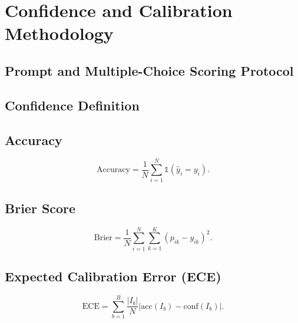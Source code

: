 \documentclass[runningheads]{llncs}
\begin{document}

\section{Confidence and Calibration Methodology}
\subsection{Prompt and Multiple-Choice Scoring Protocol}

\subsection{Confidence Definition}

\subsection{Accuracy}
\begin{equation}
  \mathrm{Accuracy} = \frac{1}{N}\sum_{i=1}^{N}
  \mathbb{1}(\hat{y}_i=y_i).
  \label{eq:accuracy}
\end{equation}

\subsection{Brier Score}
\begin{equation}
  \mathrm{Brier} =
  \frac{1}{N}\sum_{i=1}^{N}\sum_{k=1}^{K}
  (p_{ik}-y_{ik})^2.
  \label{eq:brier}
\end{equation}

\subsection{Expected Calibration Error (ECE)}
\begin{equation}
  \mathrm{ECE} =
  \sum_{b=1}^{B}\frac{|I_b|}{N}
  \left|\mathrm{acc}(I_b)-\mathrm{conf}(I_b)\right|.
  \label{eq:ece}
\end{equation}
\end{document}
